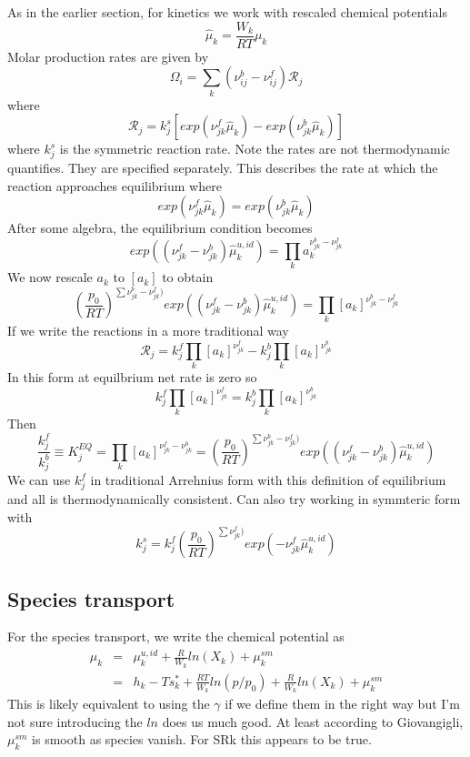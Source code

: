 \documentclass[11pt]{article}
\begin{document}
As in the earlier section, for kinetics we work with rescaled chemical potentials
\[
\hat{\mu}_k = \frac{W_k}{R T}  \mu_k
\]
Molar production rates are given by
\[
\Omega_i = \sum_k (\nu_{ij}^b - \nu_{ij}^f) \mathcal{R}_j
\]
where 
\[
\mathcal{R}_j = k_j^s \left [ exp(\nu_{jk}^f \hat{\mu}_k) - exp ( \nu_{jk}^b \hat{\mu}_k) \right ] 
\]
where $k_j^s$ is the symmetric reaction rate.
Note the rates are not thermodynamic quantifies.  They are specified separately.
This describes the rate at which the reaction approaches equilibrium where
\[
 exp(\nu_{jk}^f \hat{\mu}_k) = exp ( \nu_{jk}^b \hat{\mu}_k) 
\]
After some algebra, the equilibrium condition becomes
\begin{equation}
 exp( (\nu_{jk}^f - \nu_{jk}^b) \hat{\mu}_k^{u,id}) = \prod_k a_k^{\nu_{jk}^b-\nu_{jk}^f}
\end{equation}
We now rescale $a_k$ to $[a_k]$ to obtain
\begin{equation}
\left ( \frac{p_0}{R T}  \right )^{\sum \nu_{jk}^b-\nu_{jk}^f) }exp( (\nu_{jk}^f - \nu_{jk}^b) \hat{\mu}_k^{u,id}) = \prod_k [a_k]^{\nu_{jk}^b-\nu_{jk}^f}
\label{eq:kin_equil_sym}
\end{equation}
If we write the reactions in a more traditional way
\begin{equation}
\mathcal{R}_j = k_j^f \prod_k [a_k]^{\nu_{jk}^f}
- k_j^b \prod_k [a_k]^{\nu_{jk}^b}
\end{equation}
In this form at equilbrium net rate is zero so
\begin{equation}
 k_j^f \prod_k [a_k]^{\nu_{jk}^f}
= k_j^b \prod_k [a_k]^{\nu_{jk}^b}
\end{equation}
Then
\begin{equation}
\frac{k_j^f}{k_j^b} \equiv K_j^{EQ} = 
\prod_k [a_k]^{\nu_{jk}^f - \nu_{jk}^b}
= 
\left ( \frac{p_0}{R T}  \right )^{\sum \nu_{jk}^b-\nu_{jk}^f) } exp( (\nu_{jk}^f - \nu_{jk}^b) \hat{\mu}_k^{u,id})
\label{eq:kin_equil_trad}
\end{equation}
We can use $k_j^f$ in traditional Arrehnius form with this definition of equilibrium and all is thermodynamically
consistent.  Can also try working in symmteric form with
\[
k_j^s =  k_j^f 
\left ( \frac{p_0}{R T}  \right )^{\sum \nu_{jk}^f) }exp( -\nu_{jk}^f \hat{\mu}_k^{u,id})
\]

\subsection{Species transport}

For the species transport, we write the chemical potential as
\begin{eqnarray}
\mu_k &=& \mu_k^{u,id} + \frac{R}{W_k} ln(X_k)  +  \mu_k^{sm} \\
 &=& h_k - T s_k^* + \frac{R T}{W_k} ln(p/p_0) + \frac{R}{W_k} ln(X_k) + \mu_k^{sm}
\end{eqnarray}
This is likely equivalent to using the $\gamma$ if we define them in the right way but I'm not sure
introducing the $ln$ does us much good.
At least according to Giovangigli, $\mu_k^{sm}$ is smooth as species vanish.  For SRk this appears to be true.
\end{document}
